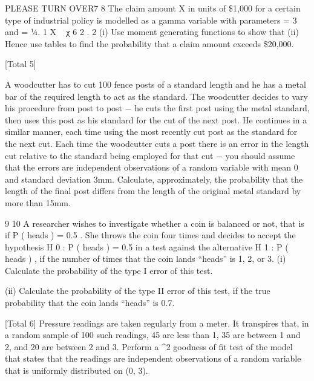 \documentclass[a4paper,12pt]{article}
\begin{document}
\begin{enumerate}
PLEASE TURN OVER7
8
The claim amount X in units of \$1,000 for a certain type of industrial policy is
modelled as a gamma variable with parameters \alpha = 3 and \lambda = 1⁄4.
1
X ~ χ 6 2 .
2
(i) Use moment generating functions to show that
(ii) Hence use tables to find the probability that a claim amount exceeds \$20,000.

[Total 5]

A woodcutter has to cut 100 fence posts of a standard length and he has a metal bar of
the required length to act as the standard. The woodcutter decides to vary his
procedure from post to post − he cuts the first post using the metal standard, then uses
this post as his standard for the cut of the next post. He continues in a similar manner,
each time using the most recently cut post as the standard for the next cut.
Each time the woodcutter cuts a post there is an error in the length cut relative to the
standard being employed for that cut − you should assume that the errors are
independent observations of a random variable with mean 0 and standard deviation
3mm.
Calculate, approximately, the probability that the length of the final post differs from
the length of the original metal standard by more than 15mm.

9
10
A researcher wishes to investigate whether a coin is balanced or not, that is if
P ( heads ) = 0.5 . She throws the coin four times and decides to accept the hypothesis
H 0 : P ( heads ) = 0.5 in a test against the alternative H 1 : P ( heads )  , if the number
of times that the coin lands “heads” is 1, 2, or 3.
(i) Calculate the probability of the type I error of this test.

(ii) Calculate the probability of the type II error of this test, if the true probability
that the coin lands “heads” is 0.7.

[Total 6]
Pressure readings are taken regularly from a meter. It transpires that, in a random
sample of 100 such readings, 45 are less than 1, 35 are between 1 and 2, and 20 are
between 2 and 3.
Perform a \chi^2 goodness of fit test of the model that states that the readings are
independent observations of a random variable that is uniformly distributed on (0, 3).


\end{enumerate}
\end{document}
